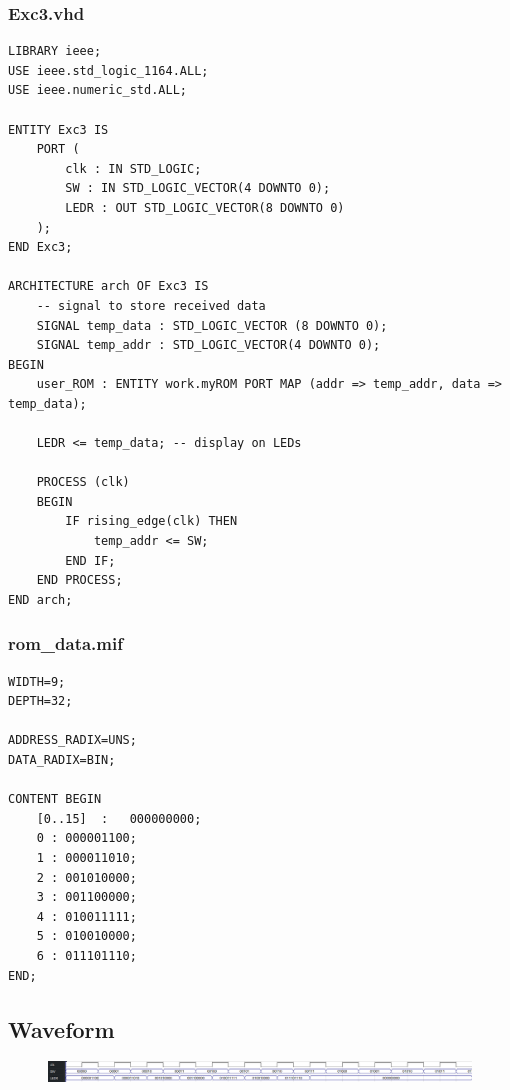 \documentclass[13pt,a4paper]{report}
\begin{document}
\subsubsection{Exc3.vhd}
\begin{verbatim}
LIBRARY ieee;
USE ieee.std_logic_1164.ALL;
USE ieee.numeric_std.ALL;

ENTITY Exc3 IS
	PORT (
		clk : IN STD_LOGIC;
		SW : IN STD_LOGIC_VECTOR(4 DOWNTO 0);
		LEDR : OUT STD_LOGIC_VECTOR(8 DOWNTO 0)
	);
END Exc3;

ARCHITECTURE arch OF Exc3 IS
	-- signal to store received data
	SIGNAL temp_data : STD_LOGIC_VECTOR (8 DOWNTO 0);
	SIGNAL temp_addr : STD_LOGIC_VECTOR(4 DOWNTO 0);
BEGIN
	user_ROM : ENTITY work.myROM PORT MAP (addr => temp_addr, data => temp_data);

	LEDR <= temp_data; -- display on LEDs

	PROCESS (clk)
	BEGIN
		IF rising_edge(clk) THEN
			temp_addr <= SW;
		END IF;
	END PROCESS;
END arch;
\end{verbatim}

\subsubsection{rom\_data.mif}
\begin{verbatim}
WIDTH=9;
DEPTH=32;

ADDRESS_RADIX=UNS;
DATA_RADIX=BIN;

CONTENT BEGIN
	[0..15]  :   000000000;
	0 : 000001100;
	1 : 000011010;
	2 : 001010000;
	3 : 001100000;
	4 : 010011111;
	5 : 010010000;
	6 : 011101110;
END;
\end{verbatim}

\subsection{Waveform}
\begin{figure}[H]
\centering
\includegraphics[scale=0.38]{images/Exc3_waveform.png}
\end{figure}
\end{document}
